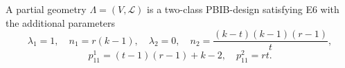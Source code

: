 A partial geometry $\Lambda = (V, \mathcal{L})$ is a two-class PBIB-design satisfying E6 with the additional parameters
$$\lambda_1 = 1,\quad n_1 = r(k - 1),\quad \lambda_2 = 0,\quad n_2 = \frac{(k - t)(k - 1)(r - 1)}{t},$$
$$p_{11}^1 = (t - 1)(r - 1) + k - 2,\quad p_{11}^2 = rt.$$

